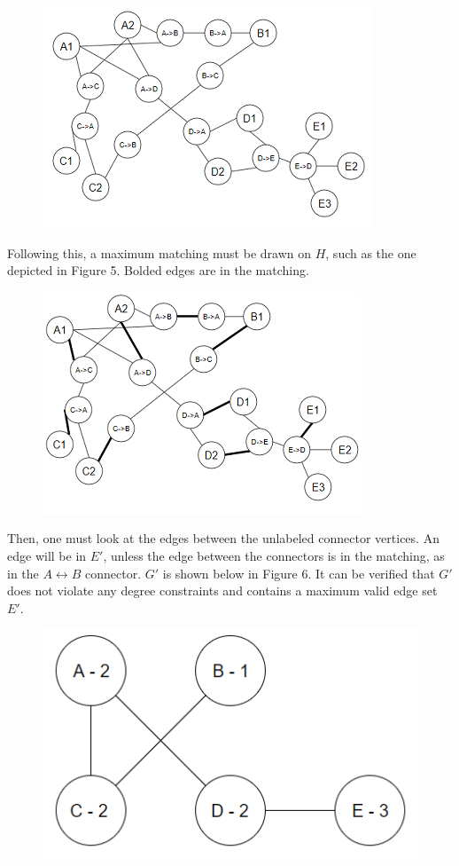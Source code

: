 \documentclass{article}
\begin{document}
	\begin{figure}[H]
		\caption{}
		\includegraphics{Figure4}
	\end{figure}

	Following this, a maximum matching must be drawn on $H$, such as the one depicted in Figure 5. Bolded edges are in the matching.
	
		\begin{figure}[H]
		\caption{}
		\includegraphics{Figure5}
	\end{figure}
		 		\vbox{%
	Then, one must look at the edges between the unlabeled connector vertices. An edge will be in $E'$, unless the edge between the connectors is in the matching, as in the $A \leftrightarrow	 B$ connector. $G'$ is shown below in Figure 6. It can be verified that $G'$ does not violate any degree constraints and contains a maximum valid edge set $E'$.
}
	\begin{figure}[H]
		\caption{}
		\includegraphics{Figure6}
	\end{figure}
\end{document}
